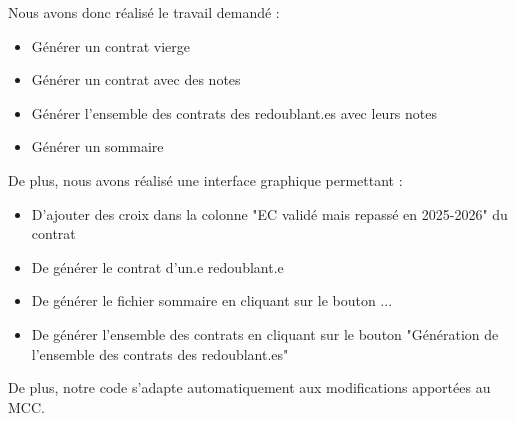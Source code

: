 Nous avons donc réalisé le travail demandé :
\begin{itemize}
    \item Générer un contrat vierge
    \item Générer un contrat avec des notes
    \item Générer l'ensemble des contrats des redoublant.es avec leurs notes
    \item Générer un sommaire
\end{itemize}


\noindent De plus, nous avons réalisé une interface graphique permettant : 
\begin{itemize}
  \item D'ajouter des croix dans la colonne "EC validé mais repassé en 2025-2026" du contrat
  \item De générer le contrat d'un.e redoublant.e
  \item De générer le fichier sommaire en cliquant sur le bouton ...
  \item De générer l'ensemble des contrats en cliquant sur le bouton "Génération de l'ensemble des contrats des redoublant.es"
\end{itemize}


De plus, notre code s'adapte automatiquement aux modifications apportées au MCC.
